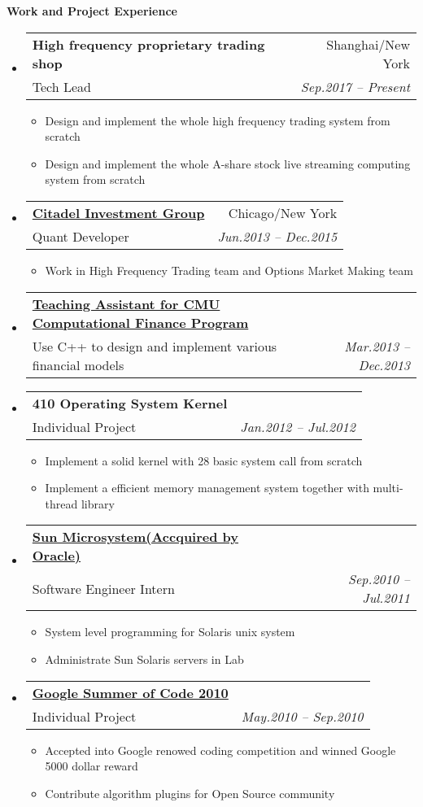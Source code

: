 \documentclass[letterpaper,11pt]{article}
\makeatletter
\newcommand{\resitem}[1]{\item #1 \vspace{-2pt}}
\newcommand{\resheading}[1]{{\large \colorbox{mygrey}{\begin{minipage}{\textwidth}{\textbf{#1 \vphantom{p\^{E}}}}\end{minipage}}}}
\newcommand{\ressubheading}[4]{
\begin{tabular*}{6.5in}{l@{\extracolsep{\fill}}r}
		\textbf{#1} & #2 \\
		{#3}{} & \textit{#4} \\
\end{tabular*}\vspace{-6pt}}
\makeatother
\begin{document}
\resheading{Work and Project Experience}
	\begin{itemize}
    \item
      \ressubheading{
      {High frequency proprietary trading shop}}{Shanghai/New York}
      {Tech Lead}{Sep.2017 -- Present}
      {\footnotesize
				\begin{itemize}
					\resitem{Design and implement the whole high frequency trading system from scratch}
          \resitem{Design and implement the whole A-share stock live streaming computing system from scratch}
				\end{itemize}
			}
      
    \item
      \ressubheading{\href{http://www.citadel.com}
      {Citadel Investment Group}}{Chicago/New York}
      {Quant Developer}{Jun.2013 -- Dec.2015}
      {\footnotesize
				\begin{itemize}
					\resitem{Work in High Frequency Trading team and 
          Options Market Making team}
				\end{itemize}
			}

    \item 
			\ressubheading{
      \href{http://tepper.cmu.edu/master-in-computational-finance/index.aspx}
      {Teaching Assistant for CMU Computational Finance Program}}
      {}{Use C++ to design and implement various financial models}
      {Mar.2013 -- Dec.2013}
      
    \item 
			\ressubheading{410 Operating System Kernel}{}
      {Individual Project}{Jan.2012 -- Jul.2012}
      { \footnotesize
				\begin{itemize}
          \resitem{Implement a solid kernel with 28 basic system call from scratch}
					\resitem{Implement a efficient memory management system together with multi-thread library}
				\end{itemize}
			}

		\item 
			\ressubheading{\href{http://www.oracle.com/us/sun/index.html}
      {Sun Microsystem(Accquired by Oracle)}}{}
      {Software Engineer Intern}
      {Sep.2010 -- Jul.2011}
      { \footnotesize
				\begin{itemize}
					\resitem{System level programming for Solaris unix system}
					\resitem{Administrate Sun Solaris servers in Lab}
				\end{itemize}
			}

		\item 
      \ressubheading{\href{http://code.google.com/soc/}{Google Summer of Code 2010}}{}{Individual Project}{May.2010 -- Sep.2010}
				{ \footnotesize
				\begin{itemize}
				  \resitem{Accepted into Google renowed coding competition and winned Google 5000 dollar reward}	
          \resitem{Contribute algorithm plugins for Open Source community}
				\end{itemize}
				}
	\end{itemize}
\end{document}
